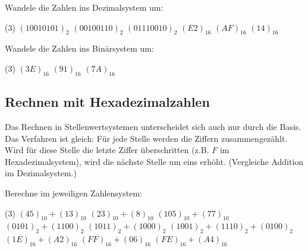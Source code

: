 \documentclass[9pt, a4paper]{arbeitsblatt}
\begin{document}
\begin{aufgabe}
	Wandele die Zahlen ins Dezimalsystem um:
	\begin{tasks}(3)
		\task $(1001 0101)_2$ \task $(0010 0110)_2$ \task $(0111 0010)_2$
		\task $(E2)_{16}$ \task $(AF)_{16}$ \task $(14)_{16}$
	\end{tasks}
\end{aufgabe}

\begin{aufgabe}
	Wandele die Zahlen ins Binärsystem um:
	\begin{tasks}(3)
		\task $(3E)_{16}$ \task $(91)_{16}$ \task $(7A)_{16}$
	\end{tasks}
\end{aufgabe}

\subsection*{Rechnen mit Hexadezimalzahlen}
Das Rechnen in Stellenwertsystemen unterscheidet sich auch nur durch die Basis.
Das Verfahren ist gleich: Für jede Stelle werden die Ziffern zusammengezählt.
Wird für diese Stelle die letzte Ziffer überschritten (z.B.
$F$ im Hexadezimalsystem), wird die nächste Stelle um eins
erhöht. (Vergleiche Addition im Dezimalsystem.)

\begin{aufgabe}
	Berechne im jeweiligen Zahlensystem:
	\begin{tasks}(3)
		\task $(45)_{10} +
				(13)_{10}$ \task $(23)_{10} +
				(8)_{10}$ \task $(105)_{10} +
				(77)_{10}$
		\task $(0101)_{2} +
				(1100)_{2}$ \task $(1011)_{2} +
				(1000)_{2}$ \task $(1001)_{2} +
				(1110)_{2} +
				(0100)_{2}$
		\task $(1E)_{16} +
				(A2)_{16}$ \task $(FF)_{16} +
				(06)_{16}$ \task $(FE)_{16} +
				(A4)_{16}$
	\end{tasks}
\end{aufgabe}
\end{document}
